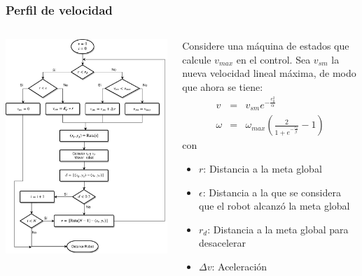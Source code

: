 \begin{frame}\frametitle{Perfil de velocidad}
  \begin{columns}
    \begin{column}{0.43\textwidth}
      \includegraphics[width=\textwidth]{Figures/AFSM.pdf}
    \end{column}
    \begin{column}{0.5\textwidth}
      Considere una máquina de estados que calcule $v_{max}$ en el control. Sea $v_{sm}$ la nueva velocidad lineal máxima, de modo que ahora se tiene:
      \begin{eqnarray*}
        v      &=& v_{sm}e^{-\frac{e_{\theta}^{2}}{\alpha}}\label{eq:NewControl1}\\
        \omega &=& \omega_{max}\left(\frac{2}{1+e^{-\frac{e_{\theta}}{\beta}}}-1\right)\label{eq:NewControl2}
      \end{eqnarray*}
      con
      \begin{itemize}
      \item $r$: Distancia a la meta global
      \item $\epsilon$: Distancia a la que se considera que el robot alcanzó la meta global
      \item $r_d$: Distancia a la meta global para desacelerar
      \item $\Delta v$: Aceleración 
      \end{itemize}
    \end{column}
  \end{columns}
\end{frame}

